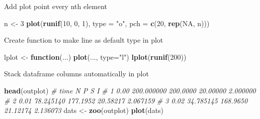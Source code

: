 \documentclass[10,portrait]{article}
\newenvironment{Shaded}{\begin{snugshade}}{\end{snugshade}}
\newcommand{\KeywordTok}[1]{\textcolor[rgb]{0.13,0.29,0.53}{\textbf{#1}}}
\newcommand{\DataTypeTok}[1]{\textcolor[rgb]{0.13,0.29,0.53}{#1}}
\newcommand{\DecValTok}[1]{\textcolor[rgb]{0.00,0.00,0.81}{#1}}
\newcommand{\StringTok}[1]{\textcolor[rgb]{0.31,0.60,0.02}{#1}}
\newcommand{\CommentTok}[1]{\textcolor[rgb]{0.56,0.35,0.01}{\textit{#1}}}
\newcommand{\OtherTok}[1]{\textcolor[rgb]{0.56,0.35,0.01}{#1}}
\newcommand{\ControlFlowTok}[1]{\textcolor[rgb]{0.13,0.29,0.53}{\textbf{#1}}}
\newcommand{\NormalTok}[1]{#1}
\begin{document}
Add plot point every nth element

\begin{Shaded}
\begin{Highlighting}[]
\NormalTok{n <-}\StringTok{ }\DecValTok{3}
\KeywordTok{plot}\NormalTok{(}\KeywordTok{runif}\NormalTok{(}\DecValTok{10}\NormalTok{, }\DecValTok{0}\NormalTok{, }\DecValTok{1}\NormalTok{), }\DataTypeTok{type =} \StringTok{"o"}\NormalTok{, }\DataTypeTok{pch =} \KeywordTok{c}\NormalTok{(}\DecValTok{20}\NormalTok{, }\KeywordTok{rep}\NormalTok{(}\OtherTok{NA}\NormalTok{, n)))}
\end{Highlighting}
\end{Shaded}

Create function to make line as default type in plot

\begin{Shaded}
\begin{Highlighting}[]
\NormalTok{lplot <-}\StringTok{ }\ControlFlowTok{function}\NormalTok{(...) }\KeywordTok{plot}\NormalTok{(..., }\DataTypeTok{type=}\StringTok{"l"}\NormalTok{)}
\KeywordTok{lplot}\NormalTok{(}\KeywordTok{runif}\NormalTok{(}\DecValTok{200}\NormalTok{))}
\end{Highlighting}
\end{Shaded}

Stack dataframe columns automatically in plot

\begin{Shaded}
\begin{Highlighting}[]
\KeywordTok{head}\NormalTok{(outplot)}
  \CommentTok{# time          N        P        S        I}
\CommentTok{# 1 0.00 200.000000 200.0000 20.00000 2.000000}
\CommentTok{# 2 0.01  78.245140 177.1952 20.58217 2.067159}
\CommentTok{# 3 0.02  34.785145 168.9650 21.12174 2.136073}
\NormalTok{dats <-}\StringTok{ }\KeywordTok{zoo}\NormalTok{(outplot)}
\KeywordTok{plot}\NormalTok{(dats)}
\end{Highlighting}
\end{Shaded}
\end{document}
